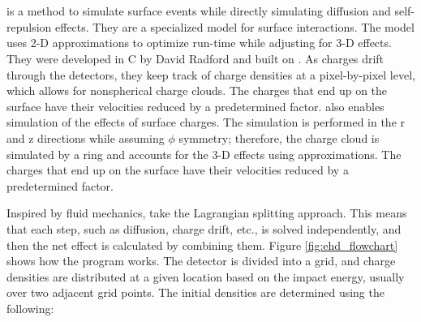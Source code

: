 


\section{{\ehd}}
{\ehd} is a method to simulate surface events while directly simulating diffusion and self-repulsion effects. They are a specialized model for surface interactions. The model uses 2-D approximations to optimize run-time while adjusting for 3-D effects. They were developed in C by David Radford and built on {\siggen}. As charges drift through the detectors, they keep track of charge densities at a pixel-by-pixel level, which allows for nonspherical charge clouds. The charges that end up on the surface have their velocities reduced by a predetermined factor. {\ehd} also enables simulation of the effects of surface charges. The simulation is performed in the r and z directions while assuming $\phi$ symmetry; therefore, the charge cloud is simulated by a ring and accounts for the 3-D effects using approximations. The charges that end up on the surface have their velocities reduced by a predetermined factor.

Inspired by fluid mechanics, {\ehd} take the Lagrangian splitting approach. This means that each step, such as diffusion, charge drift, etc., is solved independently, and then the net effect is calculated by combining them. Figure \ref{fig:ehd_flowchart} shows how the {\ehd} program works. The detector is divided into a grid, and charge densities are distributed at a given location based on the impact energy, usually over two adjacent grid points. The initial densities are determined using the following:

